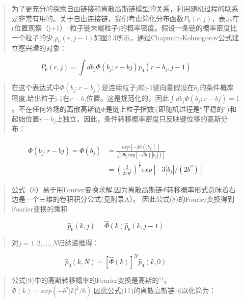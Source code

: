 			\newpage
			\begin{quotation}
				为了更充分的探索自由链接和离散高斯链模型的关系，利用随机过程的联系是非常有用的。关于自由连接链，我们考虑简化分布函数$P_{0}(r,j)$，表示在r位置观察（j+1）--粒子链末端粒子j的概率密度。假设一条链的概率密度比一个粒子的少,$p_{0}(r,j-1)$如图2.3所示，通过Chapman-Kolmogorov公式建立感兴趣的对象：
			\end{quotation}
			\begin{equation}
			P_{0}(r,j)=\int db_{j} \varPhi (b_{j};r-b{j})p_{0}(r-b_{j},j-1)
			\end{equation}
			\begin{quotation}
				在这个表达式中$\varPhi (b_{j};r-b_{j})$是连续粒子j和j-1键向量假设在$b_{j}$的条件概率密度,给出粒子j-1在$r-b_{j}$位置。这是规范化的，因此$\int db_{j} \varPhi (b_{j};r-b{j})=1$
				。不在任何外场的离散高斯链$\varPhi$是链上粒子指数j(即随机过程是“平稳的”)和起始位置$r-b_{j}$上独立，因此，条件转移概率密度只反映键位移的高斯分布：
			\end{quotation}
			\begin{equation}
			\begin{split}
			\begin{aligned}
			\varPhi(b_{j};r-b{j})=\varPhi(b_{j})&=\frac{exp[-\beta h(|b_{j}|)]}{\int db_{j}exp[-\beta h(|b_{j}|)]} \\
			&=(\frac{3}{2 \pi b^2})^{\frac{3}{2}}exp[-3|b_{j}| / (2b^2)]
			\end{aligned}
			\end{split}
			\end{equation}
			\begin{quotation}
				公式（8）易于用Fourier变换求解,因为离散高斯链$\varPhi$转移概率形式意味着右边是一个三维的卷积积分公式(见附录A）。 
				因此公式(8)的Fourier变换得到Fourier变换的乘积
			\end{quotation}
			\begin{equation}
			\hat{p}_{0}(k,j)=\hat{\varPhi}(k)\hat{p}_{0}(k,j-1)
			\end{equation}
			\begin{quotation}
				对$j=1,2,\dots ,N$归纳递推得：
			\end{quotation}
			\begin{equation}
			\hat{p}_{0}(k,N)=[\hat{\varPhi}(k)]^N\hat{p}_{0}(k,0)
			\end{equation}
			\begin{quotation}
				公式(9)中的高斯转移概率的Fourier变换是高斯的$^{11}$。$\hat{\varPhi}(k)=exp(-b^2|k|^2/6)$,因此公式(11)的离散高斯链可以化简为：
			\end{quotation}
